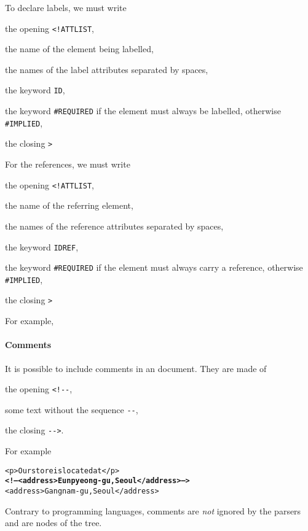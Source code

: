 To declare labels, we must write
\begin{enumerate*}

  \item the opening \verb|<!ATTLIST|,

  \item the name of the element being labelled,

  \item the names of the label attributes separated by spaces,

  \item the keyword \texttt{ID},

  \item the keyword \texttt{\#REQUIRED} if the element must always be
    labelled, otherwise \texttt{\#IMPLIED},

  \item the closing \verb|>|

\end{enumerate*}
For the references, we must write
\begin{enumerate*}

  \item the opening \verb|<!ATTLIST|,

  \item the name of the referring element,

  \item the names of the reference attributes separated by spaces,

  \item the keyword \texttt{IDREF},

  \item the keyword \texttt{\#REQUIRED} if the element must always
    carry a reference, otherwise \texttt{\#IMPLIED},

  \item the closing \verb|>|

\end{enumerate*}
For example,
\label{xml_intro:id_idref}

\paragraph{Comments}

It is possible to include comments in an \XML document. They are made
of
\begin{enumerate*}

  \item the opening \verb|<!--|,

  \item some text without the sequence \verb|--|,

  \item the closing \verb|-->|.

\end{enumerate*}
For example
\begin{alltt}
<p>Our store is located at</p>
\textbf{<!-- <address>Eunpyeong-gu, Seoul</address> -->}
<address>Gangnam-gu, Seoul</address>
\end{alltt}
Contrary to programming languages, comments are \emph{not} ignored
by the parsers and are nodes of the \XML tree.

